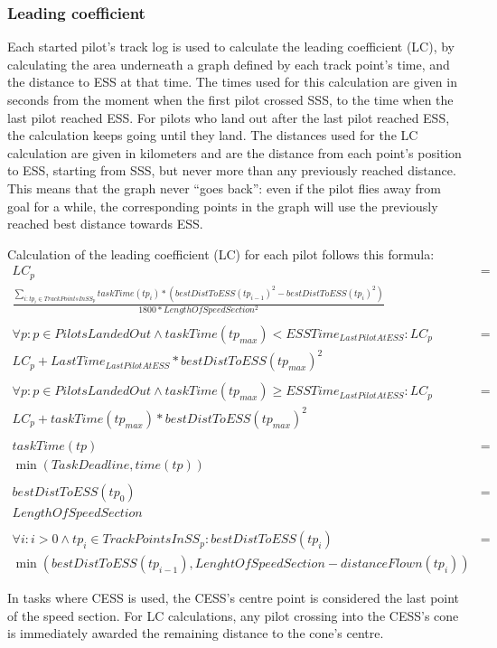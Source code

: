\documentclass{article}
\begin{document}
\subsubsection{Leading coefficient}
Each started pilot’s track log is used to calculate the leading coefficient
(LC), by calculating the area underneath a graph defined by each track point’s
time, and the distance to ESS at that time. The times used for this calculation
are given in seconds from the moment when the first pilot crossed SSS, to the
time when the last pilot reached ESS. For pilots who land out after the last
pilot reached ESS, the calculation keeps going until they land. The distances
used for the LC calculation are given in kilometers and are the distance from
each point’s position to ESS, starting from SSS, but never more than any
previously reached distance. This means that the graph never “goes back”: even
if the pilot flies away from goal for a while, the corresponding points in the
graph will use the previously reached best distance towards ESS.

Calculation of the leading coefficient (LC) for each pilot follows this
formula:
\begin{align*}
    LC_p &= \\
    \frac{\sum_{i : tp_i \in TrackPointsInSS_p} taskTime(tp_i) * (bestDistToESS(tp_{i - 1})^2 - bestDistToESS(tp_i)^2)}{1800 * LengthOfSpeedSection^2} \\
    \\
    \forall p : p \in PilotsLandedOut \land taskTime(tp_{max}) < ESSTime_{LastPilotAtESS} : LC_p &= \\
    LC_p + LastTime_{LastPilotAtESS} * bestDistToESS(tp_{max})^2 \\
    \\
    \forall p : p \in PilotsLandedOut \land taskTime(tp_{max}) \geq ESSTime_{LastPilotAtESS} : LC_p &= \\
    LC_p + taskTime(tp_{max}) * bestDistToESS(tp_{max})^2 \\
    \\
    taskTime(tp) &= \\
    \min(TaskDeadline, time(tp)) \\
    \\
    bestDistToESS(tp_0) &= \\
    LengthOfSpeedSection \\
    \\
    \forall i : i > 0 \land tp_i \in TrackPointsInSS_p : bestDistToESS(tp_i) &= \\
    \min(bestDistToESS(tp_{i - 1}), LenghtOfSpeedSection - distanceFlown(tp_i))
\end{align*}
\begin{pg}
In tasks where CESS is used, the CESS’s centre point is considered the last
point of the speed section. For LC calculations, any pilot crossing into the
CESS’s cone is immediately awarded the remaining distance to the cone’s centre.
\end{pg}
\end{document}
